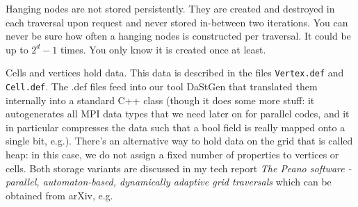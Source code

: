 \begin{remark}
  Hanging nodes are not stored persistently. They are created and destroyed in
  each traversal upon request and never stored in-between two iterations. You
  can never be sure how often a hanging nodes is constructed per traversal. It
  could be up to $2^d-1$ times. You only know it is created once at least.
\end{remark}

Cells and vertices hold data. This data is described in the files
\texttt{Vertex.def} and \texttt{Cell.def}.
The .def files feed into our tool DaStGen that translated them internally into a
standard C++ class (though it does some more stuff: it autogenerates all MPI
data types that we need later on for parallel codes, and it in particular
compresses the data such that a bool field is really mapped onto a single bit,
e.g.).
There's an alternative way to hold data on the grid that is called heap: in this
case, we do not assign a fixed number of properties to vertices or cells.
Both storage variants are discussed in my tech report {\em The Peano software -
parallel, automaton-based, dynamically adaptive grid traversals} which can be
obtained from arXiv, e.g.
